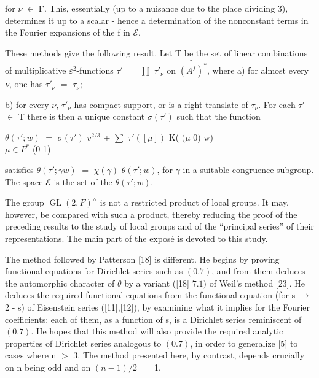 \documentclass[10pt,a4paper]{article}
\begin{document}
\clearpage
{}
\label{d035-physical-007}
\par for $\nu{}$ $\in{}$ F. This, essentially (up to a nuisance due to the place dividing 3), determines it up to a scalar - hence a determination of the nonconstant terms in the Fourier expansions of the f in $\mathcal{E}$.\par
\par These methods give the following result. Let T be the set of linear combinations of multiplicative $\varepsilon{}^{2}$-functions $\tau{}'$ $=$ $\prod{}$ $\tau{}'_\nu{}$ on $\widetilde{(A^f)^*}$, where a) for almost every $\nu{}$, one has $\tau{}'_\nu{}$ $=$ $\tau{}_\nu{}$;\par
\par b) for every $\nu{}$, $\tau{}'_\nu{}$ has compact support, or is a right translate of $\tau{}_\nu{}$. For each $\tau{}'$ $\in{}$ T there is then a unique constant $\sigma{}(\tau{}')$ such that the function\par
\par\smallskip\begin{center}\begin{minipage}{0.96\textwidth}\centering
$\theta{}(\tau{}';w)$ $=$ $\sigma{}(\tau{}')$ $v^{2/3}$ + $\sum{}$ $\tau{}'([\mu{}])$ K( $(\mu{}$ 0) w) \\ $\mu{}\in{}F^*$ (0 1)
\end{minipage}\end{center}\smallskip
\par satisfies $\theta{}(\tau{}';\gamma{}w)$ $=$ $\chi{}(\gamma{})$ $\theta{}(\tau{}';w)$, for $\gamma{}$ in a suitable congruence subgroup. The space $\mathcal{E}$ is the set of the $\theta{}(\tau{}';w)$.\par
\par The group $\operatorname{GL}(2,F)^\wedge{}$ is not a restricted product of local groups. It may, however, be compared with such a product, thereby reducing the proof of the preceding results to the study of local groups and of the ``principal series'' of their representations. The main part of the exposé is devoted to this study.\par
\par The method followed by Patterson [18] is different. He begins by proving functional equations for Dirichlet series such as $(0.7)$, and from them deduces the automorphic character of $\theta{}$ by a variant ([18] $7.1)$ of Weil's method [23]. He deduces the required functional equations from the functional equation (for s $\to{}$ 2 - s) of Eisenstein series ([11],[12]), by examining what it implies for the Fourier coefficients: each of them, as a function of s, is a Dirichlet series reminiscent of $(0.7)$. He hopes that this method will also provide the required analytic properties of Dirichlet series analogous to $(0.7)$, in order to generalize [5] to cases where n $>$ 3. The method presented here, by contrast, depends crucially on n being odd and on $(n-1)/2$ $=$ 1.\par
\end{document}

